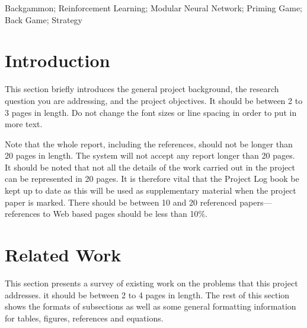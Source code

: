 \documentclass[12pt,a4paper]{article}
\begin{document}
\begin{keywords}
Backgammon; Reinforcement Learning; Modular Neural Network; Priming Game; Back Game; Strategy
\end{keywords}

\section{Introduction}
This section briefly introduces the general project background, the research question you are addressing, and the project objectives.  It should be between 2 to 3 pages in length.  Do not change the font sizes or line spacing in order to put in more text.

Note that the whole report, including the references, should not be longer than 20 pages in length.  The system will not accept any report longer than 20 pages.  It should be noted that not all the details of the work carried out in the project can be represented in 20 pages.  It is therefore vital that the Project Log book be kept up to date as this will be used as supplementary material when the project paper is marked.  There should be between 10 and 20 referenced papers---references to Web based pages should be less than 10\%.

\section{Related Work}
This section presents a survey of existing work on the problems that this project addresses.  it should be between 2 to 4 pages in length.  The rest of this section shows the formats of subsections as well as some general formatting information for tables, figures, references and equations.
\end{document}
